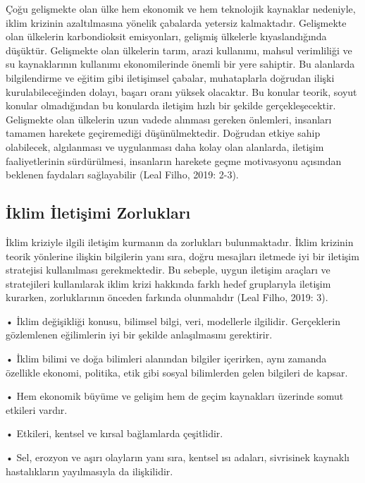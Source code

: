 \documentclass[
]{book}
\begin{document}
Çoğu gelişmekte olan ülke hem ekonomik ve hem teknolojik kaynaklar nedeniyle, iklim krizinin azaltılmasına yönelik çabalarda yetersiz kalmaktadır. Gelişmekte olan ülkelerin karbondioksit emisyonları, gelişmiş ülkelerle kıyaslandığında düşüktür. Gelişmekte olan ülkelerin tarım, arazi kullanımı, mahsul verimliliği ve su kaynaklarının kullanımı ekonomilerinde önemli bir yere sahiptir. Bu alanlarda bilgilendirme ve eğitim gibi iletişimsel çabalar, muhataplarla doğrudan ilişki kurulabileceğinden dolayı, başarı oranı yüksek olacaktır. Bu konular teorik, soyut konular olmadığından bu konularda iletişim hızlı bir şekilde gerçekleşecektir. Gelişmekte olan ülkelerin uzun vadede alınması gereken önlemleri, insanları tamamen harekete geçiremediği düşünülmektedir. Doğrudan etkiye sahip olabilecek, algılanması ve uygulanması daha kolay olan alanlarda, iletişim faaliyetlerinin sürdürülmesi, insanların harekete geçme motivasyonu açısından beklenen faydaları sağlayabilir (Leal Filho, 2019: 2-3).

\hypertarget{iklim-iletiux15fimi-zorluklarux131}{%
\subsection{İklim İletişimi Zorlukları}\label{iklim-iletiux15fimi-zorluklarux131}}

İklim kriziyle ilgili iletişim kurmanın da zorlukları bulunmaktadır. İklim krizinin teorik yönlerine ilişkin bilgilerin yanı sıra, doğru mesajları iletmede iyi bir iletişim stratejisi kullanılması gerekmektedir. Bu sebeple, uygun iletişim araçları ve stratejileri kullanılarak iklim krizi hakkında farklı hedef gruplarıyla iletişim kurarken, zorluklarının önceden farkında olunmalıdır (Leal Filho, 2019: 3).

• İklim değişikliği konusu, bilimsel bilgi, veri, modellerle ilgilidir. Gerçeklerin gözlemlenen eğilimlerin iyi bir şekilde anlaşılmasını gerektirir.

• İklim bilimi ve doğa bilimleri alanından bilgiler içerirken, aynı zamanda özellikle ekonomi, politika, etik gibi sosyal bilimlerden gelen bilgileri de kapsar.

• Hem ekonomik büyüme ve gelişim hem de geçim kaynakları üzerinde somut etkileri vardır.

• Etkileri, kentsel ve kırsal bağlamlarda çeşitlidir.

• Sel, erozyon ve aşırı olayların yanı sıra, kentsel ısı adaları, sivrisinek kaynaklı hastalıkların yayılmasıyla da ilişkilidir.
\end{document}
